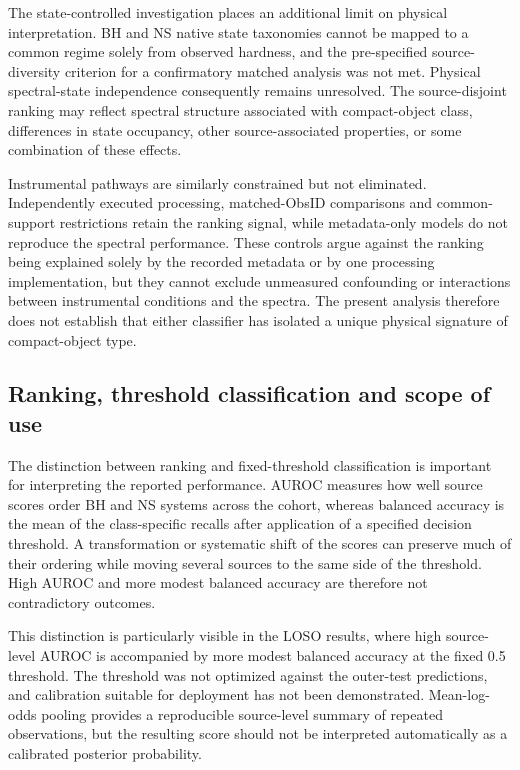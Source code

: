 \documentclass[final,5p,authoryear,nopreprintline]{elsarticle}
\begin{document}
The state-controlled investigation places an additional limit on physical interpretation. BH and NS native state taxonomies cannot be mapped to a common regime solely from observed hardness, and the pre-specified source-diversity criterion for a confirmatory matched analysis was not met. Physical spectral-state independence consequently remains unresolved. The source-disjoint ranking may reflect spectral structure associated with compact-object class, differences in state occupancy, other source-associated properties, or some combination of these effects.

Instrumental pathways are similarly constrained but not eliminated. Independently executed processing, matched-ObsID comparisons and common-support restrictions retain the ranking signal, while metadata-only models do not reproduce the spectral performance. These controls argue against the ranking being explained solely by the recorded metadata or by one processing implementation, but they cannot exclude unmeasured confounding or interactions between instrumental conditions and the spectra. The present analysis therefore does not establish that either classifier has isolated a unique physical signature of compact-object type.

\subsection{Ranking, threshold classification and scope of use}

The distinction between ranking and fixed-threshold classification is important for interpreting the reported performance. AUROC measures how well source scores order BH and NS systems across the cohort, whereas balanced accuracy is the mean of the class-specific recalls after application of a specified decision threshold. A transformation or systematic shift of the scores can preserve much of their ordering while moving several sources to the same side of the threshold. High AUROC and more modest balanced accuracy are therefore not contradictory outcomes.

This distinction is particularly visible in the LOSO results, where high source-level AUROC is accompanied by more modest balanced accuracy at the fixed 0.5 threshold. The threshold was not optimized against the outer-test predictions, and calibration suitable for deployment has not been demonstrated. Mean-log-odds pooling provides a reproducible source-level summary of repeated observations, but the resulting score should not be interpreted automatically as a calibrated posterior probability.
\end{document}
